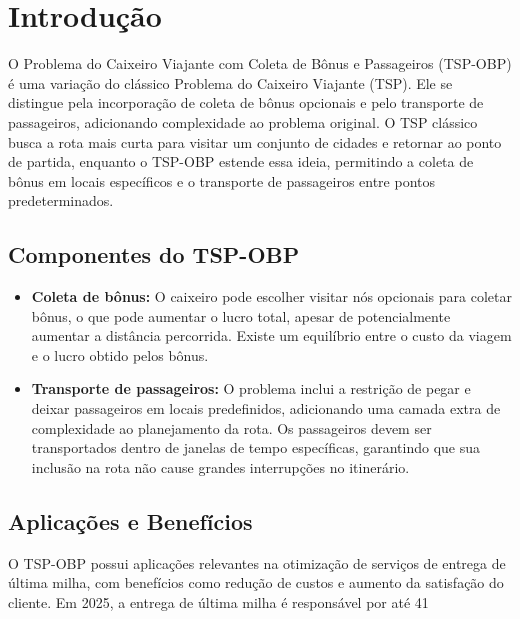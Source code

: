 \documentclass[12pt, a4paper]{report}
\begin{document}

\newpage
\tableofcontents
\thispagestyle{empty}



\newpage
\setcounter{page}{1}
\section*{Introdução}
O Problema do Caixeiro Viajante com Coleta de Bônus e Passageiros (TSP-OBP) é uma variação do clássico Problema do Caixeiro Viajante (TSP). Ele se distingue pela incorporação de coleta de bônus opcionais e pelo transporte de passageiros, adicionando complexidade ao problema original. O TSP clássico busca a rota mais curta para visitar um conjunto de cidades e retornar ao ponto de partida, enquanto o TSP-OBP estende essa ideia, permitindo a coleta de bônus em locais específicos e o transporte de passageiros entre pontos predeterminados.
\subsection*{Componentes do TSP-OBP}
\begin{itemize} \item \textbf{Coleta de bônus:} O caixeiro pode escolher visitar nós opcionais para coletar bônus, o que pode aumentar o lucro total, apesar de potencialmente aumentar a distância percorrida. Existe um equilíbrio entre o custo da viagem e o lucro obtido pelos bônus. \item \textbf{Transporte de passageiros:} O problema inclui a restrição de pegar e deixar passageiros em locais predefinidos, adicionando uma camada extra de complexidade ao planejamento da rota. Os passageiros devem ser transportados dentro de janelas de tempo específicas, garantindo que sua inclusão na rota não cause grandes interrupções no itinerário. \end{itemize}
\subsection*{Aplicações e Benefícios}
O TSP-OBP possui aplicações relevantes na otimização de serviços de entrega de última milha, com benefícios como redução de custos e aumento da satisfação do cliente. Em 2025, a entrega de última milha é responsável por até 41%
\end{document}
